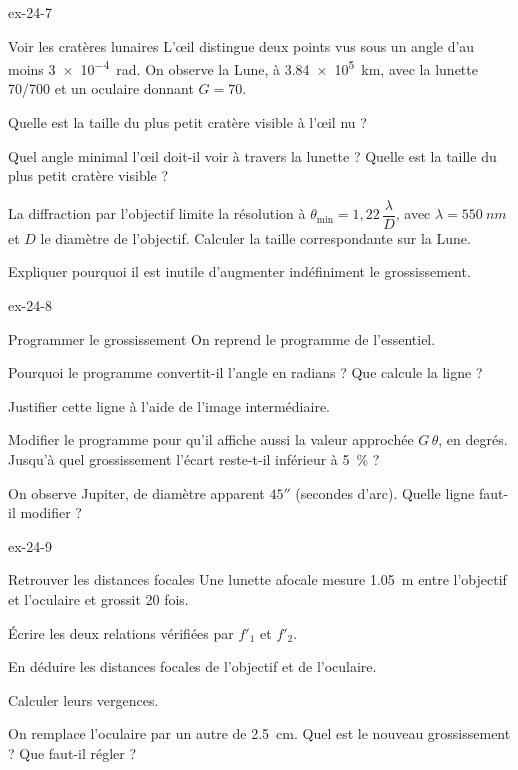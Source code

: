 \begin{blocLivre}{ex-24-7}
\begin{exercice}[2]{Voir les cratères lunaires}
L'œil distingue deux points vus sous un angle d'au moins \qty{3e-4}{rad}. On observe la Lune, à \qty{3,84e5}{km}, avec la
lunette 70/700 et un oculaire donnant $G=70$.
\begin{questions}
\item Quelle est la taille du plus petit cratère visible à l'œil nu ?
\item Quel angle minimal l'œil doit-il voir à travers la lunette ? Quelle est la taille du plus petit cratère visible ?
\item La diffraction par l'objectif limite la résolution à $\theta_\mathrm{min}=1{,}22\,\dfrac{\lambda}{D}$, avec $\lambda=\qty{550}{nm}$ et
$D$ le diamètre de l'objectif. Calculer la taille correspondante sur la Lune.
\item Expliquer pourquoi il est inutile d'augmenter indéfiniment le grossissement.
\end{questions}
\end{exercice}
\end{blocLivre}
\begin{blocLivre}{ex-24-8}
\begin{exercice}[2]{Programmer le grossissement}
On reprend le programme de l'essentiel.
\begin{questions}
\item {}Pourquoi le programme convertit-il l'angle en radians ? Que calcule la ligne
 ?
\item Justifier cette ligne à l'aide de l'image intermédiaire.
\item Modifier le programme pour qu'il affiche aussi la valeur approchée $G\,\theta$, en degrés. Jusqu'à quel grossissement
l'écart reste-t-il inférieur à 5~\% ?
\item On observe Jupiter, de diamètre apparent $45''$ (secondes d'arc). Quelle ligne faut-il modifier ?
\end{questions}
\end{exercice}
\end{blocLivre}
\begin{blocLivre}{ex-24-9}
\begin{exercice}[2]{Retrouver les distances focales}
Une lunette afocale mesure \qty{1,05}{m} entre l'objectif et l'oculaire et grossit 20 fois.
\begin{questions}
\item Écrire les deux relations vérifiées par $f'_1$ et $f'_2$.
\item En déduire les distances focales de l'objectif et de l'oculaire.
\item Calculer leurs vergences.
\item On remplace l'oculaire par un autre de \qty{2,5}{cm}. Quel est le nouveau grossissement ? Que faut-il régler ?
\end{questions}
\end{exercice}
\end{blocLivre}
